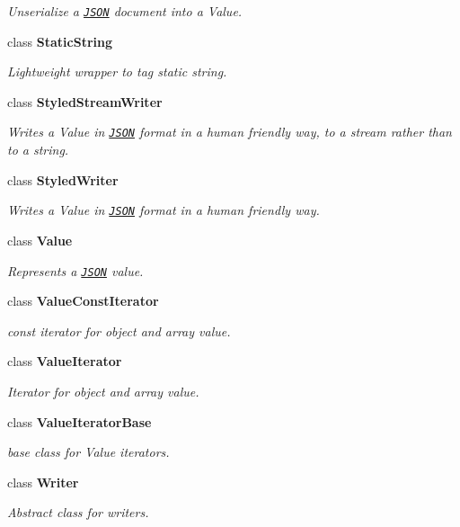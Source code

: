 \begin{DoxyCompactItemize}
\begin{DoxyCompactList}\small\item\em Unserialize a \href{http://www.json.org}{\tt J\+S\+ON} document into a Value. \end{DoxyCompactList}\item 
class {\bfseries Static\+String}
\begin{DoxyCompactList}\small\item\em Lightweight wrapper to tag static string. \end{DoxyCompactList}\item 
class {\bfseries Styled\+Stream\+Writer}
\begin{DoxyCompactList}\small\item\em Writes a Value in \href{http://www.json.org}{\tt J\+S\+ON} format in a human friendly way, to a stream rather than to a string. \end{DoxyCompactList}\item 
class {\bfseries Styled\+Writer}
\begin{DoxyCompactList}\small\item\em Writes a Value in \href{http://www.json.org}{\tt J\+S\+ON} format in a human friendly way. \end{DoxyCompactList}\item 
class {\bfseries Value}
\begin{DoxyCompactList}\small\item\em Represents a \href{http://www.json.org}{\tt J\+S\+ON} value. \end{DoxyCompactList}\item 
class {\bfseries Value\+Const\+Iterator}
\begin{DoxyCompactList}\small\item\em const iterator for object and array value. \end{DoxyCompactList}\item 
class {\bfseries Value\+Iterator}
\begin{DoxyCompactList}\small\item\em Iterator for object and array value. \end{DoxyCompactList}\item 
class {\bfseries Value\+Iterator\+Base}
\begin{DoxyCompactList}\small\item\em base class for Value iterators. \end{DoxyCompactList}\item 
class {\bfseries Writer}
\begin{DoxyCompactList}\small\item\em Abstract class for writers. \end{DoxyCompactList}\end{DoxyCompactItemize}

